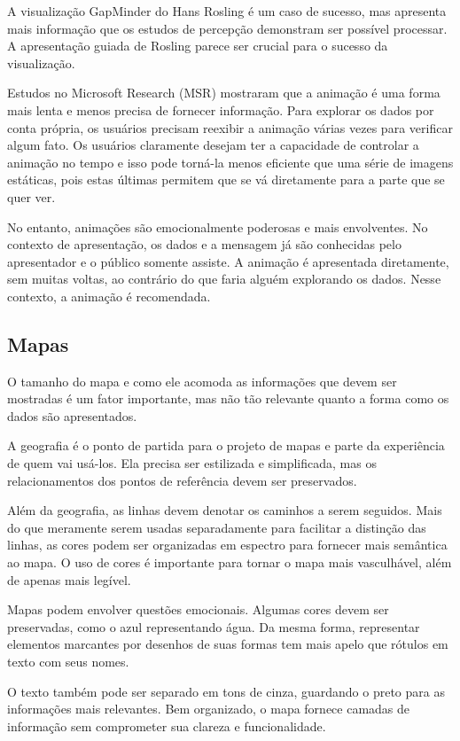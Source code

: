 \documentclass[]{article}
\begin{document}
A visualização GapMinder do Hans Rosling é um caso de sucesso, mas apresenta mais informação que os estudos de percepção demonstram ser possível processar. A apresentação guiada de Rosling parece ser crucial para o sucesso da visualização. 

Estudos no Microsoft Research (MSR) mostraram que a animação é uma forma mais lenta e menos precisa de fornecer informação. Para explorar os dados por conta própria, os usuários precisam reexibir a animação várias vezes para verificar algum fato. Os usuários claramente desejam ter a capacidade de controlar a animação no tempo e isso pode torná-la menos eficiente que uma série de imagens estáticas, pois estas últimas permitem que se vá diretamente para a parte que se quer ver.

No entanto, animações são emocionalmente poderosas e mais envolventes. No contexto de apresentação, os dados e a mensagem já são conhecidas pelo apresentador e o público somente assiste. A animação é apresentada diretamente, sem muitas voltas, ao contrário do que faria alguém explorando os dados. Nesse contexto, a animação é recomendada.

\subsection{Mapas}

O tamanho do mapa e como ele acomoda as informações que devem ser mostradas é um fator importante, mas não tão relevante quanto a forma como os dados são apresentados. \cite{steele2010beautiful}

A geografia é o ponto de partida para o projeto de mapas e parte da experiência de quem vai usá-los. Ela precisa ser estilizada e simplificada, mas os relacionamentos dos pontos de referência devem ser preservados.

Além da geografia, as linhas devem denotar os caminhos a serem seguidos. Mais do que meramente serem usadas separadamente para facilitar a distinção das linhas, as cores podem ser organizadas em espectro para fornecer mais semântica ao mapa. O uso de cores é importante para tornar o mapa mais vasculhável, além de apenas mais legível.

Mapas podem envolver questões emocionais. Algumas cores devem ser preservadas, como o azul representando água. Da mesma forma, representar elementos marcantes por desenhos de suas formas tem mais apelo que rótulos em texto com seus nomes.

O texto também pode ser separado em tons de cinza, guardando o preto para as informações mais relevantes. Bem organizado, o mapa fornece camadas de informação sem comprometer sua clareza e funcionalidade.
\end{document}
